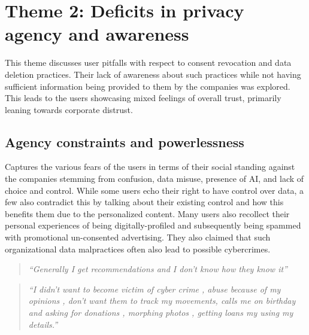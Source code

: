     
\section{Theme 2: Deficits in privacy agency and awareness} \label{T2: Lack of agency}
This theme discusses user pitfalls with respect to consent revocation and data deletion practices. Their lack of awareness about such practices while not having sufficient information being provided to them by the companies was explored. This leads to the users showcasing mixed feelings of overall trust, primarily leaning towards corporate distrust. 

\subsection{Agency constraints and powerlessness} \label{T2.1:users powerless}
Captures the various fears of the users in terms of their social standing against the companies stemming from confusion, data misuse, presence of AI, and lack of choice and control. While some users echo their right to have control over data, a few also contradict this by talking about their existing control and how this benefits them due to the personalized content. Many users also recollect their personal experiences of being digitally-profiled and subsequently being spammed with promotional un-consented advertising. They also claimed that such organizational data malpractices often also lead to possible cybercrimes.
        \begin{quote}
            \textit{``Generally I get recommendations and I don't know how they know it''}
        \end{quote}
        \begin{quote}
             \textit{``I didn't want to become victim of cyber crime , abuse because of my opinions , don't want them to track my movements, calls me on birthday and asking for donations , morphing photos , getting loans my using my details.''}
        \end{quote}
        

